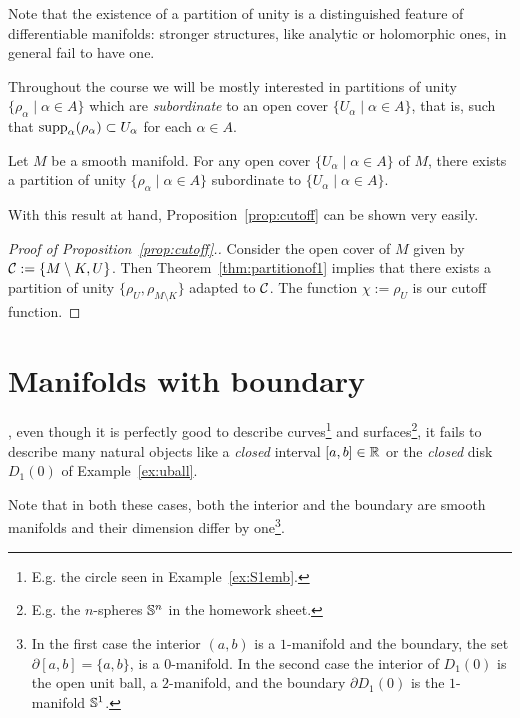 \begin{remark}
Note that the existence of a partition of unity is a distinguished feature of differentiable manifolds: stronger structures, like analytic or holomorphic ones, in general fail to have one.
\end{remark}

Throughout the course we will be mostly interested in partitions of unity $\{\rho_\alpha \mid \alpha\in A\}$ which are \emph{subordinate} to an open cover $\{U_\alpha\mid\alpha\in A\}$, that is, such that $\operatorname{supp}_\alpha(\rho_\alpha) \subset U_\alpha$ for each $\alpha\in A$.

\begin{theorem}\label{thm:partitionof1}
  Let $M$ be a smooth manifold. For any open cover $\{U_\alpha\mid\alpha\in A\}$ of $M$, there exists a partition of unity $\{\rho_\alpha \mid \alpha\in A\}$ subordinate to $\{U_\alpha\mid\alpha\in A\}$.
\end{theorem}

With this result at hand, Proposition~\ref{prop:cutoff} can be shown very easily.

\begin{proof}[Proof of Proposition~\ref{prop:cutoff}.]
  Consider the open cover of $M$ given by $\mathcal{C}:=\{M\setminus K, U\}$.
  Then Theorem~\ref{thm:partitionof1} implies that there exists a partition of unity $\{\rho_U, \rho_{M\setminus K}\}$ adapted to $\mathcal{C}$. The function $\chi := \rho_U$ is our cutoff function.
\end{proof}

\section{Manifolds with boundary}\label{sec:mbnd}

, even though it is perfectly good to describe curves\footnote{E.g. the circle seen in Example~\ref{ex:S1emb}.} and surfaces\footnote{E.g. the $n$-spheres $\mathbb{S}^n$ in the homework sheet.}, it fails to describe many natural objects like a \emph{closed} interval $[a,b]\in\mathbb{R}$ or the \emph{closed} disk $D_1(0)$ of Example~\ref{ex:uball}.

Note that in both these cases, both the interior and the boundary are smooth manifolds and their dimension differ by one\footnote{In the first case the interior $(a,b)$ is a $1$-manifold and the boundary, the set $\partial[a,b] = \{a,b\}$, is a $0$-manifold. In the second case the interior of $D_1(0)$ is the open unit ball, a $2$-manifold, and the boundary $\partial D_1(0)$ is the $1$-manifold $\mathbb{S}^1$.}.

